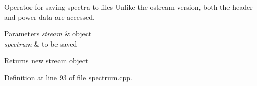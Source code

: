 Operator for saving spectra to files Unlike the ostream version, both the header and power data are accessed. 


\begin{DoxyParams}{Parameters}
{\em stream} & object \\
\hline
{\em spectrum} & to be saved \\
\hline
\end{DoxyParams}
\begin{DoxyReturn}{Returns}
new stream object 
\end{DoxyReturn}


Definition at line 93 of file spectrum.\+cpp.

